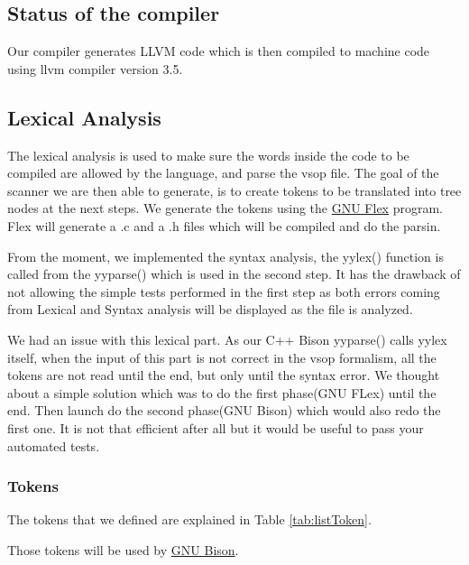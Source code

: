 \documentclass[a4paper,11pt]{article}
\begin{document}
\subsection*{Status of the compiler}

Our compiler generates LLVM code which is then compiled to machine code using llvm compiler version 3.5.

\subsection{Lexical Analysis}
  \label{sec:lexana}
  The lexical analysis is used to make sure the words inside the code to be compiled are allowed by the language, and parse the vsop file.
  The goal of the scanner we are then able to generate, is to create tokens to be translated into tree nodes at the next steps. 
  We generate the tokens using the \href{https://github.com/westes/flex}{GNU Flex} program. Flex will generate a .c and a .h files 
  which will be compiled and do the parsin.

  From the moment, we implemented the syntax analysis, the yylex() function is called from the yyparse() which is used in the second step.
  It has the drawback of not allowing the simple tests performed in the first step as both errors coming from Lexical and Syntax analysis
  will be displayed as the file is analyzed. 

  We had an issue with this lexical part. As our C++ Bison yyparse() calls yylex itself, when the input of this part is not correct 
  in the vsop formalism, all the tokens are not read until the end, but only until the syntax error. 
  We thought about a simple solution which was to do the first phase(GNU FLex) until the end. Then launch do the second phase(GNU Bison) 
  which would also redo the first one. It is not that efficient after all but it would be useful to pass your automated tests.
  



  \subsubsection{Tokens}
    The tokens that we defined are explained in Table \ref{tab:listToken}.

    Those tokens will be used by \href{http://www.gnu.org/software/bison/}{GNU Bison}.
\end{document}
